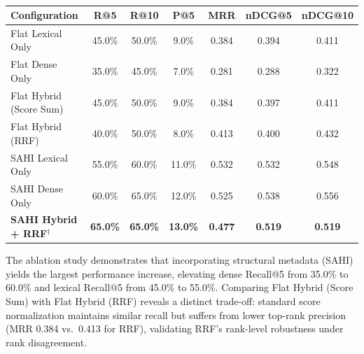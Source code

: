 \begin{table}[H]
\caption{}
\label{tab:ablation}
\centering
\small
\begin{tabular}{lcccccc}
\hline
\textbf{Configuration} & \textbf{R@5} & \textbf{R@10} & \textbf{P@5}
  & \textbf{MRR} & \textbf{nDCG@5} & \textbf{nDCG@10} \\ \hline
Flat Lexical Only       & 45.0\% & 50.0\% &  9.0\% & 0.384 & 0.394 & 0.411 \\
Flat Dense Only         & 35.0\% & 45.0\% &  7.0\% & 0.281 & 0.288 & 0.322 \\
Flat Hybrid (Score Sum) & 45.0\% & 50.0\% &  9.0\% & 0.384 & 0.397 & 0.411 \\
Flat Hybrid (RRF)       & 40.0\% & 50.0\% &  8.0\% & 0.413 & 0.400 & 0.432 \\
SAHI Lexical Only       & 55.0\% & 60.0\% & 11.0\% & 0.532 & 0.532 & 0.548 \\
SAHI Dense Only         & 60.0\% & 65.0\% & 12.0\% & 0.525 & 0.538 & 0.556 \\
\textbf{SAHI Hybrid + RRF$^\dagger$}  & \textbf{65.0\%} & \textbf{65.0\%} & \textbf{13.0\%}
  & \textbf{0.477} & \textbf{0.519} & \textbf{0.519} \\ \hline
\end{tabular}
\end{table}

The ablation study demonstrates that incorporating structural metadata (SAHI) yields the largest performance increase, elevating dense Recall@5 from 35.0\% to 60.0\% and lexical Recall@5 from 45.0\% to 55.0\%. Comparing Flat Hybrid (Score Sum) with Flat Hybrid (RRF) reveals a distinct trade-off: standard score normalization maintains similar recall but suffers from lower top-rank precision (MRR 0.384 vs.\ 0.413 for RRF), validating RRF's rank-level robustness under rank disagreement. 

